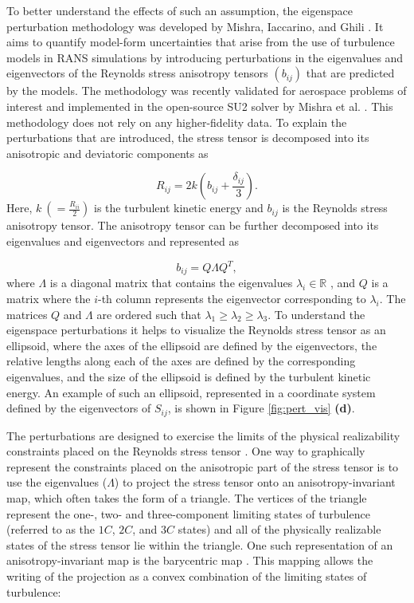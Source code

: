 To better understand the effects of such an assumption, the eigenspace perturbation methodology was developed by Mishra, Iaccarino, and Ghili \cite{iaccarino_eig_pert}. It aims to quantify model-form uncertainties that arise from the use of turbulence models in RANS simulations by introducing perturbations in the eigenvalues and eigenvectors of the Reynolds stress anisotropy tensors $\left ( b_{ij} \right )$ that are predicted by the models. The methodology was recently validated for aerospace problems of interest and implemented in the open-source SU2 solver by Mishra et al. \cite{mishra_uncertainty_2019}.  This methodology does not rely on any higher-fidelity data. To explain the perturbations that are introduced, the stress tensor is decomposed into its anisotropic and deviatoric components as
 
\begin{equation}
    R_{ij}=2k(b_{ij}+\frac{\delta_{ij}}{3}).
\end{equation}
Here, $k~(=\frac{R_{ii}}{2})$ is the turbulent kinetic energy and $b_{ij}$ is the Reynolds stress anisotropy tensor. The anisotropy tensor can be further decomposed into its eigenvalues and eigenvectors and represented as

\begin{equation}\label{equ:eigendecomposition}
b_{ij}=Q \Lambda Q^T,
\end{equation}
where $\Lambda$ is a diagonal matrix that contains the eigenvalues $\lambda_i \in \mathbb{R}$ \cite{Gerolymos2016AlgebraicPA}, and $Q$ is a matrix where the $i$-th column represents the eigenvector corresponding to $\lambda_i$. The matrices $Q$ and $\Lambda$ are ordered such that $\lambda_{1}\geq\lambda_{2}\geq\lambda_{3}$. To understand the eigenspace perturbations it helps to visualize the Reynolds stress tensor as an ellipsoid, where the axes of the ellipsoid are defined by the eigenvectors, the relative lengths along each of the axes are defined by the corresponding eigenvalues, and the size of the ellipsoid is defined by the turbulent kinetic energy. An example of such an ellipsoid, represented in a coordinate system defined by the eigenvectors of $S_{ij}$, is shown in Figure \ref{fig:pert_vis} \textbf{(d)}. 

The perturbations are designed to exercise the limits of the physical realizability constraints placed on the Reynolds stress tensor \cite{schumann1977realizability,speziale1994realizability,2014realizability}. One way to graphically represent the constraints placed on the anisotropic part of the stress tensor is to use the eigenvalues ($\Lambda$) to project the stress tensor onto an anisotropy-invariant map, which often takes the form of a triangle. The vertices of the triangle represent the one-, two- and three-component limiting states of turbulence (referred to as the $1C$, $2C$, and $3C$ states) and all of the physically realizable states of the stress tensor lie within the triangle. One such representation of an anisotropy-invariant map is the barycentric map \cite{banerjee2007presentation}. This mapping allows the writing of the projection as a convex combination of the limiting states of turbulence: 

